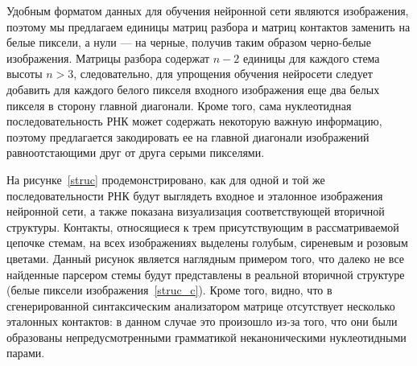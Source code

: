 Удобным форматом данных для обучения нейронной сети являются изображения, поэтому мы предлагаем  единицы матриц разбора и матриц контактов заменить на белые пиксели, а нули --- на черные, получив таким образом черно-белые изображения. Матрицы разбора содержат $n - 2$ единицы для каждого стема высоты $n>3$, следовательно, для упрощения обучения нейросети следует добавить для каждого белого пикселя входного изображения еще два белых пикселя в сторону главной диагонали. Кроме того, сама нуклеотидная последовательность РНК может содержать некоторую важную информацию, поэтому предлагается закодировать ее на главной диагонали изображений равноотстающими друг от друга серыми пикселями. 

На рисунке~\ref{struc} продемонстрировано, как для одной и той же последовательности РНК будут выглядеть входное и эталонное изображения нейронной сети, а также показана визуализация соответствующей вторичной структуры. Контакты, относящиеся к трем присутствующим в рассматриваемой цепочке стемам, на всех изображениях выделены голубым, сиреневым и розовым цветами. Данный рисунок является наглядным примером того, что далеко не все найденные парсером стемы будут представлены в реальной вторичной структуре (белые пиксели изображения~\ref{struc_c}). Кроме того, видно, что в сгенерированной синтаксическим анализатором матрице отсутствует несколько эталонных контактов: в данном случае это произошло из-за того, что они были образованы непредусмотренными грамматикой неканоническими нуклеотидными парами. 

